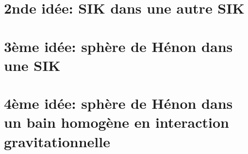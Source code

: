 	\section[2nde idée]{2nde idée: SIK dans une autre SIK}
		
	\section[3ème idée]{3ème idée: sphère de Hénon dans une SIK}
		
	\section[4ème idée]{4ème idée: sphère de Hénon dans un bain homogène en interaction gravitationnelle\label{Simu::Idee4}}
		

